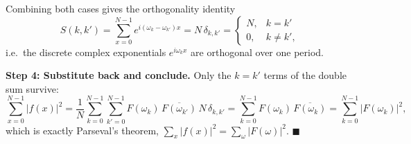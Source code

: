 \documentclass[11pt,a4paper]{article}
\begin{document}
Combining both cases gives the orthogonality identity
\[
S(k,k') = \sum_{x=0}^{N-1} e^{i(\omega_k-\omega_{k'})x} = N\,\delta_{k,k'}
=\begin{cases} N, & k=k' \\ 0, & k\neq k', \end{cases}
\]
i.e.\ the discrete complex exponentials $e^{i\omega_k x}$ are orthogonal over one period.

\textbf{Step 4: Substitute back and conclude.}
Only the $k=k'$ terms of the double sum survive:
\[
\sum_{x=0}^{N-1} |f(x)|^2
= \frac{1}{N}\sum_{k=0}^{N-1}\sum_{k'=0}^{N-1} F(\omega_k)\,\overline{F(\omega_{k'})}\, N\,\delta_{k,k'}
= \sum_{k=0}^{N-1} F(\omega_k)\,\overline{F(\omega_k)}
= \sum_{k=0}^{N-1} |F(\omega_k)|^2,
\]
which is exactly Parseval's theorem, $\sum_{x} |f(x)|^2 = \sum_{\omega} |F(\omega)|^2$.
$\blacksquare$
\end{document}
